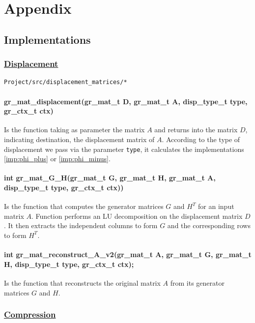 \section*{Appendix}
\subsection*{Implementations}

\subsubsection*{\underline{Displacement}}

\begin{verbatim}
Project/src/displacement_matrices/*
\end{verbatim}

\paragraph{gr\_mat\_displacement(gr\_mat\_t D, gr\_mat\_t A,
disp\_type\_t type, gr\_ctx\_t ctx)}
Is the function taking as parameter the matrix $A$ and returns into
the matrix $D$, indicating destination, the displacement matrix of $A$.
According to the type of displacement we pass via the parameter
\texttt{type}, it calculates the implementations \eqref{imp:phi_plus}
or \eqref{imp:phi_minus}.

\paragraph{int gr\_mat\_G\_H(gr\_mat\_t G, gr\_mat\_t H, gr\_mat\_t
A, disp\_type\_t type, gr\_ctx\_t ctx))}
Is the function that computes the generator matrices $G$ and $H^T$
for an input matrix $A$.
Function performs an LU decomposition on the displacement matrix $D$.
It then extracts the independent columns to form $G$ and the
corresponding rows to form $H^T$.

\paragraph{int gr\_mat\_reconstruct\_A\_v2(gr\_mat\_t A, gr\_mat\_t
G, gr\_mat\_t H, disp\_type\_t type, gr\_ctx\_t ctx);}
Is the function that reconstructs the original matrix $A$ from its
generator matrices $G$ and $H$.

\subsubsection*{\underline{Compression}}\label{annexe:compression}

